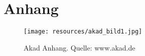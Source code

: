 \chapter{Anhang}

\begin{figure}[H]
  \begin{center}
    \texttt{[image: resources/akad\_bild1.jpg]}
    \caption[Akad Anhang]{Akad Anhang. Quelle: www.akad.de}
  \end{center}
\end{figure}

%